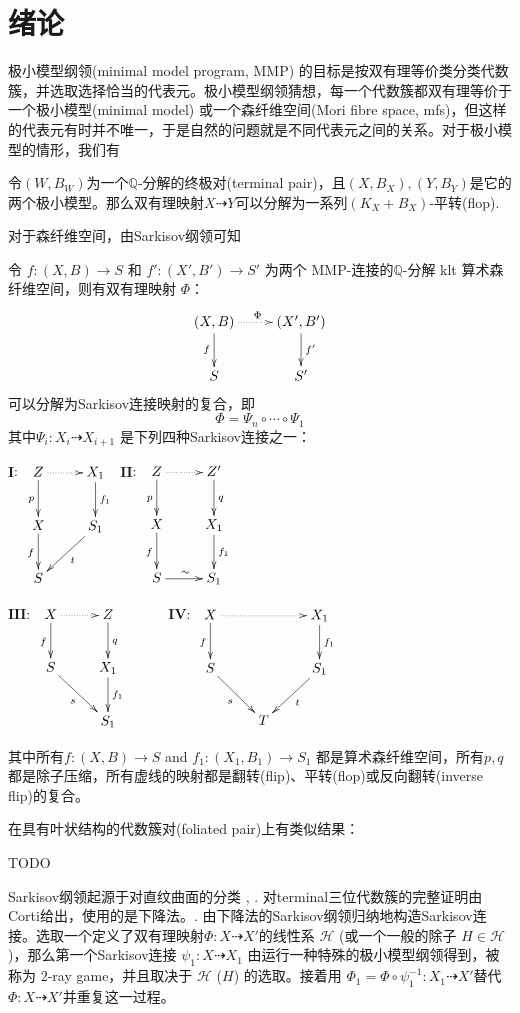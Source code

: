 \chapter{绪论}
极小模型纲领(minimal model program, MMP) 的目标是按双有理等价类分类代数簇，并选取选择恰当的代表元。极小模型纲领猜想，每一个代数簇都双有理等价于一个极小模型(minimal model) 或一个森纤维空间(Mori fibre space, mfs)，但这样的代表元有时并不唯一，于是自然的问题就是不同代表元之间的关系。对于极小模型的情形，我们有
\begin{theorem}[平转连接极小模型]
  令$(W,B_{W})$为一个$\mathbb{Q}$-分解的终极对(terminal pair)，且$(X,B_{X}),(Y,B_{Y})$是它的两个极小模型。那么双有理映射$X \dashrightarrow Y$可以分解为一系列$(K_{X}+B_{X})$-平转(flop).
\end{theorem}
对于森纤维空间，由Sarkisov纲领可知
\begin{theorem}[主定理]
  令 $ f:(X, B)\to S$ 和 $f':(X', B')\to S' $ 为两个 MMP-连接的$ \mathbb{Q} $-分解 klt 算术森纤维空间，则有双有理映射 $\Phi$：
  \[
    \xymatrix{
      (X,B)\ar[d]_f\ar@{.>}[r]^\Phi & (X',B')\ar[d]^{f'}\\
      S & S'}
  \]
可以分解为Sarkisov连接映射的复合，即
\[
  \Phi=\Psi_{n}\circ \cdots \circ \Psi_{1}
\]
其中$\Psi_{i}:X_{i}\dashrightarrow X_{i+1} $ 是下列四种Sarkisov连接之一：

  $\textbf{I}$:
  $\xymatrix{
      Z\ar[d]_p\ar@{.>}[r]&X_1\ar[d]^{f_1}\\
      X\ar[d]_f&S_1\ar[dl]^{t}\\
      S &}$
  $\textbf{II}$:
  $\xymatrix{
      Z\ar[d]_p\ar@{.>}[r]&Z'\ar[d]^{q}&\\
      X\ar[d]_{f}&X_1\ar[d]^{f_1}\\
      S\ar[r]^{\sim}&S_1}$

  $\textbf{III}$:
  $
    \xymatrix{
    X\ar@{.>}[r]\ar[d]_f& Z\ar[d]^q& \\
    S\ar[rd]_{s}         & X_{1}\ar[d]^{f_{1}}&\\
    &S_{1}
    }
  $
  $\textbf{IV}$:
  $\xymatrix{
      X\ar[d]_f\ar@{.>}[rr]&&X_1\ar[d]^{f_1}\\
      S\ar[dr]_{s}&&S_1\ar[dl]^{t}\\
      &T &}$

      其中所有$ f:(X, B)\to S $ and $ f_1:(X_1, B_1)\to S_1 $ 都是算术森纤维空间，所有$p,q$ 都是除子压缩，所有虚线的映射都是翻转(flip)、平转(flop)或反向翻转(inverse flip)的复合。
\end{theorem}
在具有叶状结构的代数簇对(foliated pair)上有类似结果：
\begin{theorem}[主定理2]
 TODO 
\end{theorem}
Sarkisov纲领起源于对直纹曲面的分类 \cite{sarkisovBIRATIONALAUTOMORPHISMSCONIC1981}, \cite{sarkisovCONICBUNDLESTRUCTURES1983}.
对terminal三位代数簇的完整证明由Corti给出，使用的是下降法。\cite{cortiFactoringBirationalMaps}.
由下降法的Sarkisov纲领归纳地构造Sarkisov连接。选取一个定义了双有理映射$\Phi:X \dashrightarrow X'$的线性系 $\mathcal{H}$ (或一个一般的除子 $H \in \mathcal{H}$)，那么第一个Sarkisov连接 $\psi_1:X\dashrightarrow X_1$ 由运行一种特殊的极小模型纲领得到，被称为 $2$-ray game，并且取决于 $\mathcal{H}$ ($H$) 的选取。接着用 $\Phi_{1}=\Phi\circ \psi_1^{-1}: X_1 \dashrightarrow X'$替代 $\Phi:X\dashrightarrow X'$并重复这一过程。 

